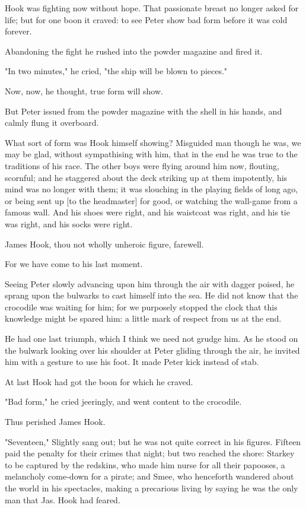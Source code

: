 Hook was fighting now without hope. That passionate breast no longer asked
for life; but for one boon it craved: to see Peter show bad form before it
was cold forever.


Abandoning the fight he rushed into the powder magazine and fired it.


"In two minutes," he cried, "the ship will be blown to pieces."


Now, now, he thought, true form will show.


But Peter issued from the powder magazine with the shell in his hands, and
calmly flung it overboard.


What sort of form was Hook himself showing? Misguided man though he was,
we may be glad, without sympathising with him, that in the end he was true
to the traditions of his race. The other boys were flying around him now,
flouting, scornful; and he staggered about the deck striking up at them
impotently, his mind was no longer with them; it was slouching in the
playing fields of long ago, or being sent up [to the headmaster] for good,
or watching the wall-game from a famous wall. And his shoes were right,
and his waistcoat was right, and his tie was right, and his socks were
right.


James Hook, thou not wholly unheroic figure, farewell.


For we have come to his last moment.


Seeing Peter slowly advancing upon him through the air with dagger poised,
he sprang upon the bulwarks to cast himself into the sea. He did not know
that the crocodile was waiting for him; for we purposely stopped the clock
that this knowledge might be spared him: a little mark of respect from us
at the end.


He had one last triumph, which I think we need not grudge him. As he stood
on the bulwark looking over his shoulder at Peter gliding through the air,
he invited him with a gesture to use his foot. It made Peter kick instead
of stab.


At last Hook had got the boon for which he craved.


"Bad form," he cried jeeringly, and went content to the crocodile.


Thus perished James Hook.


"Seventeen," Slightly sang out; but he was not quite correct in his
figures. Fifteen paid the penalty for their crimes that night; but two
reached the shore: Starkey to be captured by the redskins, who made him
nurse for all their papooses, a melancholy come-down for a pirate; and
Smee, who henceforth wandered about the world in his spectacles, making a
precarious living by saying he was the only man that Jas. Hook had feared.


